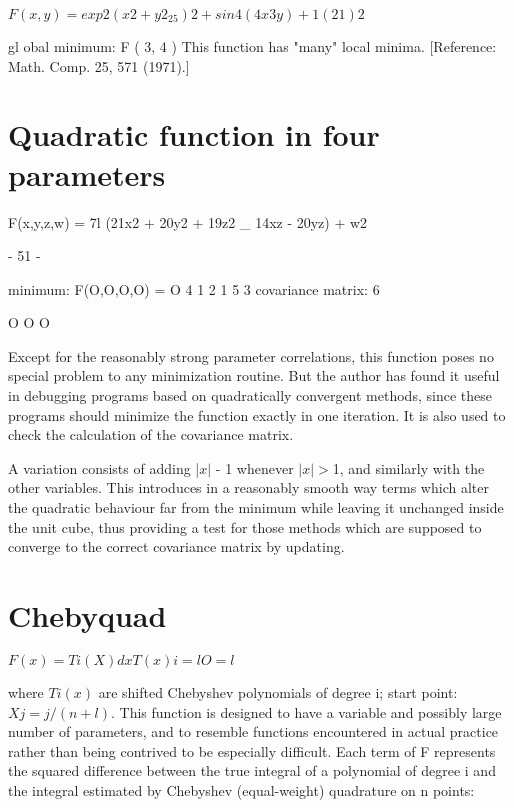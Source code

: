  
    $F(x,y) = exp 2 (x2 + y2 _ 25)2 + sin4 (4x  3y)  +  1  (2     1  )2$
 
 
 gl obal minimum:             F ( 3, 4 )
      This function has "many" local minima.
[Reference:  Math. Comp. 25, 571 (1971).]
 
 
\section{Quadratic function in four parameters}
 
 
 
        {F(x,y,z,w) = 7l (21x2 + 20y2 + 19z2 _ 14xz - 20yz) + w2}
 
                                  - 51 -
 
minimum:                    F(O,O,O,O) = O
                            4 1 2
                             1 5 3
covariance matrix:      $             6$
 
 
                                O O O
 
 
 
     Except for the reasonably strong parameter correlations, this function
poses no special problem to any minimization routine.  But the
author has found it useful in debugging programs based on quadratically
convergent methods, since these programs should minimize the function
exactly in one iteration.  It is also used to check the calculation of
the covariance matrix.
 
     A variation consists of adding |$x|$ - 1 whenever $|x| >$1, and
similarly with the other variables.  This introduces in a reasonably
smooth way terms which alter the quadratic behaviour far from the
minimum
while leaving it unchanged inside the unit cube, thus providing a test
for those methods which are supposed to converge to the correct
covariance matrix by updating.
 
 \section{Chebyquad}
 
 
                $F(x) =    Ti(X ) dx          T (x )
 
                      i=l O              =l$
 
 
where $Ti(x)$ are shifted Chebyshev polynomials of degree i;
start point:                 $Xj = j/(n + l) $.
     This function is designed to have a variable and possibly large
number of parameters, and to resemble functions encountered in actual
practice rather than being contrived to be especially difficult.  Each
term of F represents the squared difference between the true integral
of a polynomial of degree i and the integral estimated by Chebyshev
(equal-weight) quadrature on n points:
 
